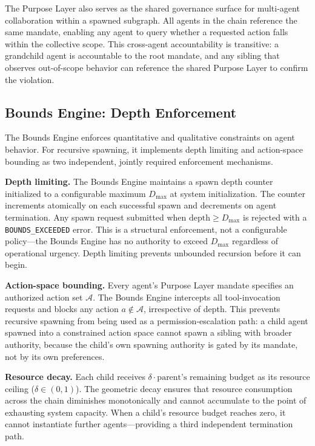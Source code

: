 The Purpose Layer also serves as the shared governance surface for multi-agent collaboration within a spawned subgraph. All agents in the chain reference the same mandate, enabling any agent to query whether a requested action falls within the collective scope. This cross-agent accountability is transitive: a grandchild agent is accountable to the root mandate, and any sibling that observes out-of-scope behavior can reference the shared Purpose Layer to confirm the violation.

\subsection{Bounds Engine: Depth Enforcement}
\label{sec:bounds-engine}

The Bounds Engine enforces quantitative and qualitative constraints on agent behavior. For recursive spawning, it implements depth limiting and action-space bounding as two independent, jointly required enforcement mechanisms.

\textbf{Depth limiting.} The Bounds Engine maintains a spawn depth counter initialized to a configurable maximum $D_{\max}$ at system initialization. The counter increments atomically on each successful spawn and decrements on agent termination. Any spawn request submitted when $\text{depth} \geq D_{\max}$ is rejected with a \texttt{BOUNDS\_EXCEEDED} error. This is a structural enforcement, not a configurable policy—the Bounds Engine has no authority to exceed $D_{\max}$ regardless of operational urgency. Depth limiting prevents unbounded recursion before it can begin.

\textbf{Action-space bounding.} Every agent's Purpose Layer mandate specifies an authorized action set $\mathcal{A}$. The Bounds Engine intercepts all tool-invocation requests and blocks any action $a \notin \mathcal{A}$, irrespective of depth. This prevents recursive spawning from being used as a permission-escalation path: a child agent spawned into a constrained action space cannot spawn a sibling with broader authority, because the child's own spawning authority is gated by its mandate, not by its own preferences.

\textbf{Resource decay.} Each child receives $\delta \cdot \text{parent's remaining budget}$ as its resource ceiling ($\delta \in (0,1)$). The geometric decay ensures that resource consumption across the chain diminishes monotonically and cannot accumulate to the point of exhausting system capacity. When a child's resource budget reaches zero, it cannot instantiate further agents—providing a third independent termination path.

